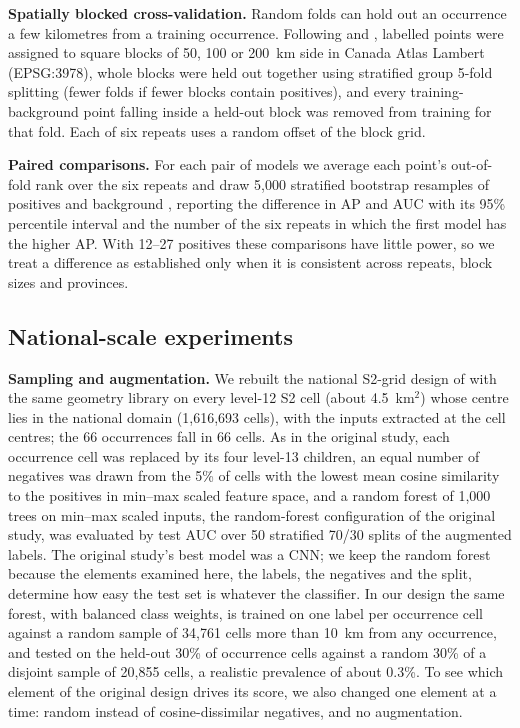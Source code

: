 \documentclass[pdflatex,sn-apa]{sn-jnl}
\begin{document}
\textbf{Spatially blocked cross-validation.} Random folds can hold out an occurrence a few kilometres from a training occurrence. Following \citet{Roberts2017} and \citet{Valavi2019}, labelled points were assigned to square blocks of 50, 100 or 200~km side in Canada Atlas Lambert (EPSG:3978), whole blocks were held out together using stratified group 5-fold splitting (fewer folds if fewer blocks contain positives), and every training-background point falling inside a held-out block was removed from training for that fold. Each of six repeats uses a random offset of the block grid.

\textbf{Paired comparisons.} For each pair of models we average each point's out-of-fold rank over the six repeats and draw 5,000 stratified bootstrap resamples of positives and background \citep{Efron1993}, reporting the difference in AP and AUC with its 95\% percentile interval and the number of the six repeats in which the first model has the higher AP. With 12--27 positives these comparisons have little power, so we treat a difference as established only when it is consistent across repeats, block sizes and provinces.

\subsection{National-scale experiments}\label{sec:national-methods}

\textbf{Sampling and augmentation.} We rebuilt the national S2-grid design of \citet{Parsa2024} with the same geometry library on every level-12 S2 cell (about 4.5~km$^2$) whose centre lies in the national domain (1,616,693 cells), with the inputs extracted at the cell centres; the 66 occurrences fall in 66 cells. As in the original study, each occurrence cell was replaced by its four level-13 children, an equal number of negatives was drawn from the 5\% of cells with the lowest mean cosine similarity to the positives in min--max scaled feature space, and a random forest of 1,000 trees on min--max scaled inputs, the random-forest configuration of the original study, was evaluated by test AUC over 50 stratified 70/30 splits of the augmented labels. The original study's best model was a CNN; we keep the random forest because the elements examined here, the labels, the negatives and the split, determine how easy the test set is whatever the classifier. In our design the same forest, with balanced class weights, is trained on one label per occurrence cell against a random sample of 34,761 cells more than 10~km from any occurrence, and tested on the held-out 30\% of occurrence cells against a random 30\% of a disjoint sample of 20,855 cells, a realistic prevalence of about 0.3\%. To see which element of the original design drives its score, we also changed one element at a time: random instead of cosine-dissimilar negatives, and no augmentation.
\end{document}
